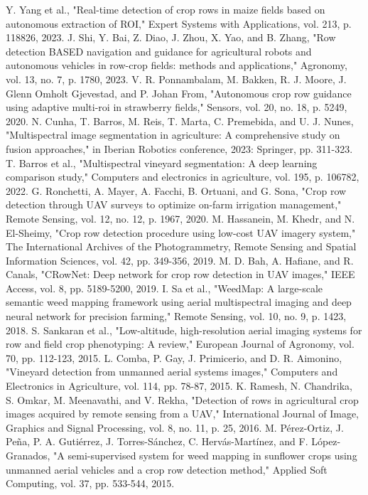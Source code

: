 \documentclass[conference]{IEEEtran}
\begin{document}
\begin{thebibliography}{00}
 Y. Yang et al., "Real-time detection of crop rows in maize fields based on autonomous extraction of ROI," Expert Systems with Applications, vol. 213, p. 118826, 2023.
 J. Shi, Y. Bai, Z. Diao, J. Zhou, X. Yao, and B. Zhang, "Row detection BASED navigation and guidance for agricultural robots and autonomous vehicles in row-crop fields: methods and applications," Agronomy, vol. 13, no. 7, p. 1780, 2023.
 V. R. Ponnambalam, M. Bakken, R. J. Moore, J. Glenn Omholt Gjevestad, and P. Johan From, "Autonomous crop row guidance using adaptive multi-roi in strawberry fields," Sensors, vol. 20, no. 18, p. 5249, 2020.
 N. Cunha, T. Barros, M. Reis, T. Marta, C. Premebida, and U. J. Nunes, "Multispectral image segmentation in agriculture: A comprehensive study on fusion approaches," in Iberian Robotics conference, 2023: Springer, pp. 311-323.
 T. Barros et al., "Multispectral vineyard segmentation: A deep learning comparison study," Computers and electronics in agriculture, vol. 195, p. 106782, 2022.
 G. Ronchetti, A. Mayer, A. Facchi, B. Ortuani, and G. Sona, "Crop row detection through UAV surveys to optimize on-farm irrigation management," Remote Sensing, vol. 12, no. 12, p. 1967, 2020.
 M. Hassanein, M. Khedr, and N. El-Sheimy, "Crop row detection procedure using low-cost UAV imagery system," The International Archives of the Photogrammetry, Remote Sensing and Spatial Information Sciences, vol. 42, pp. 349-356, 2019.
 M. D. Bah, A. Hafiane, and R. Canals, "CRowNet: Deep network for crop row detection in UAV images," IEEE Access, vol. 8, pp. 5189-5200, 2019.
 I. Sa et al., "WeedMap: A large-scale semantic weed mapping framework using aerial multispectral imaging and deep neural network for precision farming," Remote Sensing, vol. 10, no. 9, p. 1423, 2018.
 S. Sankaran et al., "Low-altitude, high-resolution aerial imaging systems for row and field crop phenotyping: A review," European Journal of Agronomy, vol. 70, pp. 112-123, 2015.
 L. Comba, P. Gay, J. Primicerio, and D. R. Aimonino, "Vineyard detection from unmanned aerial systems images," Computers and Electronics in Agriculture, vol. 114, pp. 78-87, 2015.
 K. Ramesh, N. Chandrika, S. Omkar, M. Meenavathi, and V. Rekha, "Detection of rows in agricultural crop images acquired by remote sensing from a UAV," International Journal of Image, Graphics and Signal Processing, vol. 8, no. 11, p. 25, 2016.
 M. Pérez-Ortiz, J. Peña, P. A. Gutiérrez, J. Torres-Sánchez, C. Hervás-Martínez, and F. López-Granados, "A semi-supervised system for weed mapping in sunflower crops using unmanned aerial vehicles and a crop row detection method," Applied Soft Computing, vol. 37, pp. 533-544, 2015.

\end{thebibliography}
\end{document}
